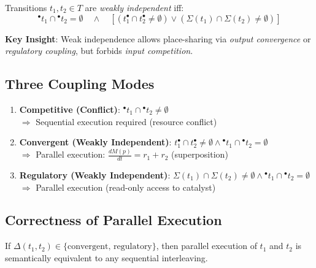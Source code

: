 \documentclass[runningheads]{llncs}
\newcommand{\preset}[1]{\ensuremath{{}^{\bullet}#1}}
\newcommand{\postset}[1]{\ensuremath{#1^{\bullet}}}
\newcommand{\RegSet}[1]{\ensuremath{\Sigma(#1)}}
\newcommand{\DepType}[2]{\ensuremath{\Delta(#1,#2)}}
\begin{document}
\begin{definition}
Transitions $t_1, t_2 \in T$ are \emph{weakly independent} iff:
\begin{equation}
\preset{t_1} \cap \preset{t_2} = \emptyset \quad \land \quad [(\postset{t_1} \cap \postset{t_2} \neq \emptyset) \lor (\RegSet{t_1} \cap \RegSet{t_2} \neq \emptyset)]
\end{equation}
\end{definition}

\textbf{Key Insight}: Weak independence allows place-sharing via \emph{output convergence} or \emph{regulatory coupling}, but forbids \emph{input competition}.

\subsection{Three Coupling Modes}

\begin{enumerate}
    \item \textbf{Competitive (Conflict)}: $\preset{t_1} \cap \preset{t_2} \neq \emptyset$ \\
    $\Rightarrow$ Sequential execution required (resource conflict)
    
    \item \textbf{Convergent (Weakly Independent)}: $\postset{t_1} \cap \postset{t_2} \neq \emptyset \land \preset{t_1} \cap \preset{t_2} = \emptyset$ \\
    $\Rightarrow$ Parallel execution: $\frac{dM(p)}{dt} = r_1 + r_2$ (superposition)
    
    \item \textbf{Regulatory (Weakly Independent)}: $\RegSet{t_1} \cap \RegSet{t_2} \neq \emptyset \land \preset{t_1} \cap \preset{t_2} = \emptyset$ \\
    $\Rightarrow$ Parallel execution (read-only access to catalyst)
\end{enumerate}

\subsection{Correctness of Parallel Execution}

\begin{theorem}
\label{thm:weak_correctness}
If $\DepType{t_1}{t_2} \in \{\text{convergent, regulatory}\}$, then parallel execution of $t_1$ and $t_2$ is semantically equivalent to any sequential interleaving.
\end{theorem}
\end{document}
